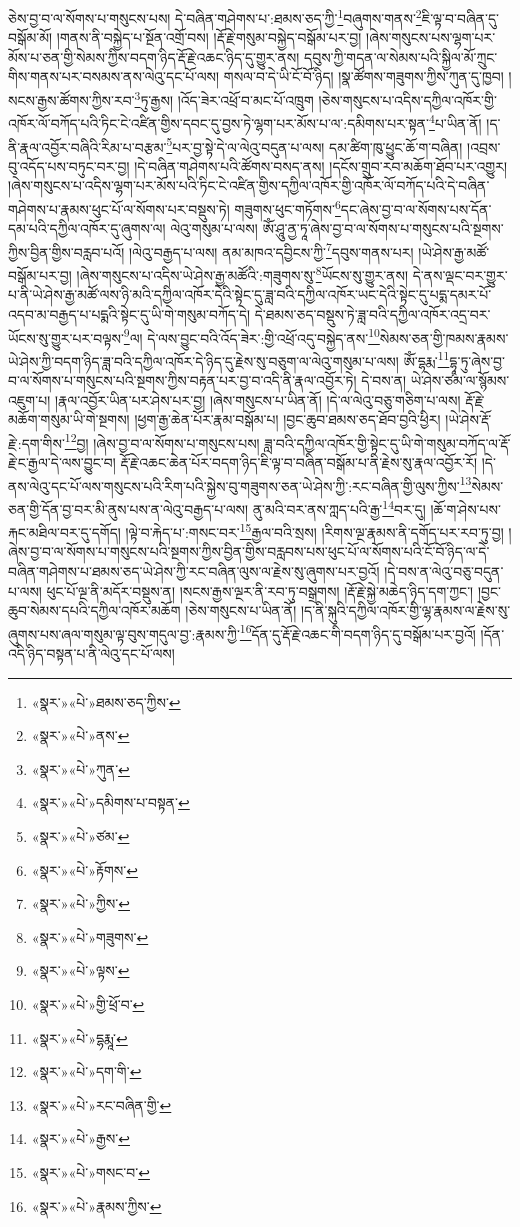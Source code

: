 ཅེས་བྱ་བ་ལ་སོགས་པ་གསུངས་པས། དེ་བཞིན་གཤེགས་པ་:ཐམས་ཅད་ཀྱི་\footnote{«སྣར་»«པེ་»ཐམས་ཅད་ཀྱིས་}བཞུགས་གནས་\footnote{«སྣར་»«པེ་»ནས་}ཇི་ལྟ་བ་བཞིན་དུ་བསྒོམ་མོ། །གནས་ནི་བསྐྱེད་པ་སྔོན་འགྲོ་བས། །རྡོ་རྗེ་གསུམ་བསྐྱེད་བསྒོམ་པར་བྱ། །ཞེས་གསུངས་པས་ལྷག་པར་མོས་པ་ཅན་གྱི་སེམས་ཀྱིས་བདག་ཉིད་རྡོ་རྗེ་འཆང་ཉིད་དུ་གྱུར་ནས། དབུས་ཀྱི་གདན་ལ་སེམས་པའི་སྐྱིལ་མོ་ཀྲུང་གིས་གནས་པར་བསམས་ནས་ལེའུ་དང་པོ་ལས། གསལ་བ་དེ་ཡི་ངོ་བོ་ཉིད། །སྣ་ཚོགས་གཟུགས་ཀྱིས་ཀུན་དུ་ཁྱབ། །སངས་རྒྱས་ཚོགས་ཀྱིས་རབ་\footnote{«སྣར་»«པེ་»ཀུན་}ཏུ་རྒྱས། །འོད་ཟེར་འཕྲོ་བ་མང་པོ་འཁྲུག །ཅེས་གསུངས་པ་འདིས་དཀྱིལ་འཁོར་གྱི་འཁོར་ལོ་བཀོད་པའི་ཏིང་ངེ་འཛིན་གྱིས་དབང་དུ་བྱས་ཏེ་ལྷག་པར་མོས་པ་ལ་:དམིགས་པར་སྟན་\footnote{«སྣར་»«པེ་»དམིགས་པ་བསྟན་}པ་ཡིན་ནོ། །ད་ནི་རྣལ་འབྱོར་བཞིའི་རིམ་པ་བརྩམ་\footnote{«སྣར་»«པེ་»ཙམ་}པར་བྱ་སྟེ་དེ་ལ་ལེའུ་བདུན་པ་ལས། དམ་ཚིག་ཁུ་ཕྱུང་ཆོ་ག་བཞིན། །འབྲས་བུ་འདོད་པས་བཏུང་བར་བྱ། །དེ་བཞིན་གཤེགས་པའི་ཚོགས་བསད་ནས། །དངོས་གྲུབ་རབ་མཆོག་ཐོབ་པར་འགྱུར། །ཞེས་གསུངས་པ་འདིས་ལྷག་པར་མོས་པའི་ཏིང་ངེ་འཛིན་གྱིས་དཀྱིལ་འཁོར་གྱི་འཁོར་ལོ་བཀོད་པའི་དེ་བཞིན་གཤེགས་པ་རྣམས་ཕུང་པོ་ལ་སོགས་པར་བསྡུས་ཏེ། གཟུགས་ཕུང་གཏོགས་\footnote{«སྣར་»«པེ་»རྟོགས་}དང་ཞེས་བྱ་བ་ལ་སོགས་པས་དོན་དམ་པའི་དཀྱིལ་འཁོར་དུ་ཞུགས་ལ། ལེའུ་གསུམ་པ་ལས། ཨོཾ་ཤཱུ་ནྱ་ཏཱ་ཞེས་བྱ་བ་ལ་སོགས་པ་གསུངས་པའི་སྔགས་ཀྱིས་བྱིན་གྱིས་བརླབ་པའོ། །ལེའུ་བརྒྱད་པ་ལས། ནམ་མཁའ་དབྱིངས་ཀྱི་\footnote{«སྣར་»«པེ་»ཀྱིས་}དབུས་གནས་པར། །ཡེ་ཤེས་རྒྱ་མཚོ་བསྒོམ་པར་བྱ། །ཞེས་གསུངས་པ་འདིས་ཡེ་ཤེས་རྒྱ་མཚོའི་:གཟུགས་སུ་\footnote{«སྣར་»«པེ་»གཟུགས་}ཡོངས་སུ་གྱུར་ནས། དེ་ནས་ལྡང་བར་གྱུར་པ་ནི་ཡེ་ཤེས་རྒྱ་མཚོ་ལས་ཉི་མའི་དཀྱིལ་འཁོར་དེའི་སྟེང་དུ་ཟླ་བའི་དཀྱིལ་འཁོར་ཡང་དེའི་སྟེང་དུ་པདྨ་དམར་པོ་འདབ་མ་བརྒྱད་པ་པདྨའི་སྟེང་དུ་ཡི་གེ་གསུམ་བཀོད་དེ། དེ་ཐམས་ཅད་བསྡུས་ཏེ་ཟླ་བའི་དཀྱིལ་འཁོར་འདྲ་བར་ཡོངས་སུ་གྱུར་པར་བལྟས་\footnote{«སྣར་»«པེ་»ལྟས་}ལ། དེ་ལས་བྱུང་བའི་འོད་ཟེར་:གྱི་འཕྲོ་འདུ་བསྐྱེད་ནས་\footnote{«སྣར་»«པེ་»གྱི་ཕྲོ་བ་}སེམས་ཅན་གྱི་ཁམས་རྣམས་ཡེ་ཤེས་ཀྱི་བདག་ཉིད་ཟླ་བའི་དཀྱིལ་འཁོར་དེ་ཉིད་དུ་རྗེས་སུ་བཅུག་ལ་ལེའུ་གསུམ་པ་ལས། ཨོཾ་དྷརྨ་\footnote{«སྣར་»«པེ་»དྷརྨཱ་}དྷཱ་ཏུ་ཞེས་བྱ་བ་ལ་སོགས་པ་གསུངས་པའི་སྔགས་ཀྱིས་བརྟན་པར་བྱ་བ་འདི་ནི་རྣལ་འབྱོར་ཏེ། དེ་བས་ན། ཡེ་ཤེས་ཙམ་ལ་སྙོམས་འཇུག་པ། །རྣལ་འབྱོར་ཡིན་པར་ཤེས་པར་བྱ། །ཞེས་གསུངས་པ་ཡིན་ནོ། །དེ་ལ་ལེའུ་བཅུ་གཅིག་པ་ལས། རྡོ་རྗེ་མཆོག་གསུམ་ཡི་གེ་སྔགས། །ཕྱག་རྒྱ་ཆེན་པོར་རྣམ་བསྒོམ་པ། །བྱང་ཆུབ་ཐམས་ཅད་ཐོབ་བྱའི་ཕྱིར། །ཡེ་ཤེས་རྡོ་རྗེ་:དག་གིས་\footnote{«སྣར་»«པེ་»དག་གི་}བྱ། །ཞེས་བྱ་བ་ལ་སོགས་པ་གསུངས་པས། ཟླ་བའི་དཀྱིལ་འཁོར་གྱི་སྟེང་དུ་ཡི་གེ་གསུམ་བཀོད་ལ་རྡོ་རྗེ་ང་རྒྱལ་དེ་ལས་བྱུང་བ། རྡོ་རྗེ་འཆང་ཆེན་པོར་བདག་ཉིད་ཇི་ལྟ་བ་བཞིན་བསྒོམ་པ་ནི་རྗེས་སུ་རྣལ་འབྱོར་རོ། །དེ་ནས་ལེའུ་དང་པོ་ལས་གསུངས་པའི་རིག་པའི་སྐྱེས་བུ་གཟུགས་ཅན་ཡེ་ཤེས་ཀྱི་:རང་བཞིན་གྱི་ལུས་ཀྱིས་\footnote{«སྣར་»«པེ་»རང་བཞིན་གྱི་}སེམས་ཅན་གྱི་དོན་བྱ་བར་མི་ནུས་པས་ན་ལེའུ་བརྒྱད་པ་ལས། ནུ་མའི་བར་ནས་ཀླད་པའི་རྒྱ་\footnote{«སྣར་»«པེ་»རྒྱས་}བར་དུ། །ཆོ་ག་ཤེས་པས་རྐང་མཐིལ་བར་དུ་དགོད། །ལྟེ་བ་རྐེད་པ་:གསང་བར་\footnote{«སྣར་»«པེ་»གསང་བ་}རྒྱལ་བའི་སྲས། །རིགས་ལྔ་རྣམས་ནི་དགོད་པར་རབ་ཏུ་བྱ། །ཞེས་བྱ་བ་ལ་སོགས་པ་གསུངས་པའི་སྔགས་ཀྱིས་བྱིན་གྱིས་བརླབས་པས་ཕུང་པོ་ལ་སོགས་པའི་ངོ་བོ་ཉིད་ལ་དེ་བཞིན་གཤེགས་པ་ཐམས་ཅད་ཡེ་ཤེས་ཀྱི་རང་བཞིན་ལུས་ལ་རྗེས་སུ་ཞུགས་པར་བྱའོ། །དེ་བས་ན་ལེའུ་བཅུ་བདུན་པ་ལས། ཕུང་པོ་ལྔ་ནི་མདོར་བསྡུས་ན། །སངས་རྒྱས་ལྔར་ནི་རབ་ཏུ་བསྒྲགས། །རྡོ་རྗེ་སྐྱེ་མཆེད་ཉིད་དག་ཀྱང་། །བྱང་ཆུབ་སེམས་དཔའི་དཀྱིལ་འཁོར་མཆོག །ཅེས་གསུངས་པ་ཡིན་ནོ། །ད་ནི་སྐུའི་དཀྱིལ་འཁོར་གྱི་ལྷ་རྣམས་ལ་རྗེས་སུ་ཞུགས་པས་ཞལ་གསུམ་ལྟ་བུས་གདུལ་བྱ་:རྣམས་ཀྱི་\footnote{«སྣར་»«པེ་»རྣམས་ཀྱིས་}དོན་དུ་རྡོ་རྗེ་འཆང་གི་བདག་ཉིད་དུ་བསྒོམ་པར་བྱའོ། །དོན་འདི་ཉིད་བསྟན་པ་ནི་ལེའུ་དང་པོ་ལས། 